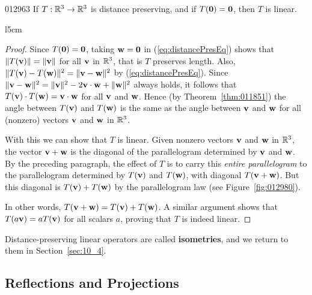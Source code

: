 \begin{theorem}{}{012963}
If $T : \mathbb{R}^3 \to \mathbb{R}^3$ is distance preserving, and if $T(\textbf{0}) = \textbf{0}$, then $T$ is linear.
\end{theorem}

\begin{wrapfigure}[12]{l}{5cm} 
\centering

\caption{\label{fig:012980}}
\end{wrapfigure}

\begin{proof}
Since $T(\textbf{0}) = \textbf{0}$, taking $\textbf{w} = \textbf{0}$ in (\ref{eq:distancePresEq}) shows that $\| T(\textbf{v})\| = \|\textbf{v}\|$ for all $\textbf{v}$ in $\mathbb{R}^3$, that is $T$ preserves length. Also, $\| T(\textbf{v}) - T(\textbf{w})\|^{2} = \|\textbf{v} - \textbf{w}\|^{2}$ by (\ref{eq:distancePresEq}). Since $\|\textbf{v} - \textbf{w}\|^{2} = \|\textbf{v}\|^{2} - 2\textbf{v} \cdot \textbf{w} + \|\textbf{w}\|^{2}$ always holds, it follows that $T(\textbf{v}) \cdot T(\textbf{w}) = \textbf{v} \cdot \textbf{w}$ for all $\textbf{v}$ and $\textbf{w}$. Hence (by Theorem~\ref{thm:011851}) the angle between $T(\textbf{v})$ and $T(\textbf{w})$ is the same as the angle between $\textbf{v}$ and $\textbf{w}$ for all (nonzero) vectors $\textbf{v}$ and $\textbf{w}$ in $\mathbb{R}^3$.


With this we can show that $T$ is linear. Given nonzero vectors $\textbf{v}$ and $\textbf{w}$ in $\mathbb{R}^3$, the vector $\textbf{v} + \textbf{w}$ is the diagonal of the parallelogram determined by $\textbf{v}$ and $\textbf{w}$. By the preceding paragraph, the effect of $T$ is to carry this \textit{entire parallelogram} to the parallelogram determined by $T(\textbf{v})$ and $T(\textbf{w})$, with diagonal $T(\textbf{v} + \textbf{w})$. But this diagonal is $T(\textbf{v}) + T(\textbf{w})$ by the parallelogram law (see Figure~\ref{fig:012980}).

In other words, $T(\textbf{v} + \textbf{w}) = T(\textbf{v}) + T(\textbf{w})$. A similar argument shows that $T(a\textbf{v}) = aT(\textbf{v})$ for all scalars $a$, proving that $T$ is indeed linear.
\end{proof}

\noindent Distance-preserving linear operators are called \textbf{isometries}, and we return to them in Section~\ref{sec:10_4}.


\subsection*{Reflections and Projections}

